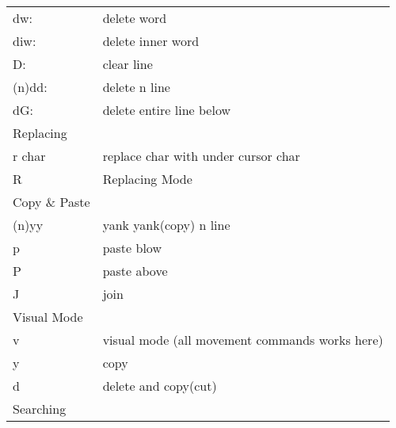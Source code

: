 \documentclass{article}
\begin{document}
\begin{longtable}{ll}
			dw:                                         & delete word                                       \\
			diw:                                        & delete inner word                                 \\
			D:                                          & clear line                                        \\
			(n)dd:                                      & delete n line                                     \\
			dG:                                         & delete entire line below                          \\ \hline
			Replacing                                   &                                                   \\ \hline
			r char                                      & replace char with under cursor char               \\
			R                                           & Replacing Mode                                    \\ \hline
			Copy \& Paste                               &                                                   \\ \hline
			(n)yy                                       & yank yank(copy) n line                            \\
			p                                           & paste blow                                        \\
			P                                           & paste above                                       \\
			J                                           & join                                              \\ \hline
			Visual Mode                                 &                                                   \\ \hline
			v                                           & visual mode (all movement commands works here)    \\
			y                                           & copy                                              \\
			d                                           & delete and copy(cut)                              \\ \hline
			Searching                                   &                                                   \\ \hline

\end{longtable}
\end{document}
